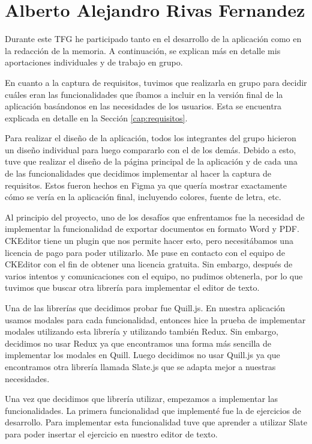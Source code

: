 \section{Alberto Alejandro Rivas Fernandez}
Durante este TFG he participado tanto en el desarrollo de la aplicación como en la redacción de la memoria. A continuación, se explican más en detalle mis aportaciones individuales y de trabajo en grupo.

En cuanto a la captura de requisitos, tuvimos que realizarla en grupo para decidir cuáles eran las funcionalidades que íbamos a incluir en la versión final de la aplicación basándonos en las necesidades de los usuarios. Esta se encuentra explicada en detalle en la Sección \ref{cap:requisitos}.

Para realizar el diseño de la aplicación, todos los integrantes del grupo hicieron un diseño individual para luego compararlo con el de los demás. Debido a esto, tuve que realizar el diseño de la página principal de la aplicación y de cada una de las funcionalidades que decidimos implementar al hacer la captura de requisitos. Estos fueron hechos en Figma ya que quería mostrar exactamente cómo se vería en la aplicación final, incluyendo colores, fuente de letra, etc.

Al principio del proyecto, uno de los desafíos que enfrentamos fue la necesidad de implementar la funcionalidad de exportar documentos en formato Word y PDF. CKEditor tiene un plugin que nos permite hacer esto, pero necesitábamos una licencia de pago para poder utilizarlo. Me puse en contacto con el equipo de CKEditor con el fin de obtener una licencia gratuita. Sin embargo, después de varios intentos y comunicaciones con el equipo, no pudimos obtenerla, por lo que tuvimos que buscar otra librería para implementar el editor de texto.

Una de las librerías que decidimos probar fue Quill.js. En nuestra aplicación usamos modales para cada funcionalidad, entonces hice la prueba de implementar modales utilizando esta librería y utilizando también Redux. Sin embargo, decidimos no usar Redux ya que encontramos una forma más sencilla de implementar los modales en Quill. Luego decidimos no usar Quill.js ya que encontramos otra librería llamada Slate.js que se adapta mejor a nuestras necesidades.

Una vez que decidimos que librería utilizar, empezamos a implementar las funcionalidades. La primera funcionalidad que implementé fue la de ejercicios de desarrollo. Para implementar esta funcionalidad tuve que aprender a utilizar Slate para poder insertar el ejercicio en nuestro editor de texto.

